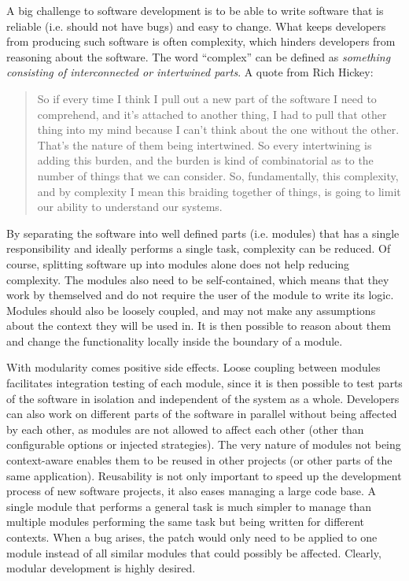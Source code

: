 \documentclass[a4paper,11pt]{kth-mag}
\begin{document}
        A big challenge to software development is to be able to write software that is reliable (i.e. should not have bugs) and easy to change.
        What keeps developers from producing such software is often complexity, which hinders developers from reasoning about the software.
        The word ``complex'' can be defined as \emph{something consisting of interconnected or intertwined parts}.
        A quote from Rich Hickey:
        \begin{quote}
          So if every time I think I pull out a new part of the software I need to comprehend, and it's attached to another thing, I had to pull that other thing into my mind because I can't think about the one without the other.
          That's the nature of them being intertwined. So every intertwining is adding this burden, and the burden is kind of combinatorial as to the number of things that we can consider.
          So, fundamentally, this complexity, and by complexity I mean this braiding together of things, is going to limit our ability to understand our systems.
        \end{quote}
        By separating the software into well defined parts (i.e. modules) that has a single responsibility and ideally performs a single task, complexity can be reduced.
        Of course, splitting software up into modules alone does not help reducing complexity.
        The modules also need to be self-contained, which means that they work by themselved and do not require the user of the module to write its logic.
        Modules should also be loosely coupled, and may not make any assumptions about the context they will be used in.
        It is then possible to reason about them and change the functionality locally inside the boundary of a module.
        
        With modularity comes positive side effects.
        Loose coupling between modules facilitates integration testing of each module, since it is then possible to test parts of the software in isolation and independent of the system as a whole.
        Developers can also work on different parts of the software in parallel without being affected by each other, as modules are not allowed to affect each other (other than configurable options or injected strategies).
        The very nature of modules not being context-aware enables them to be reused in other projects (or other parts of the same application).
        Reusability is not only important to speed up the development process of new software projects, it also eases managing a large code base.
        A single module that performs a general task is much simpler to manage than multiple modules performing the same task but being written for different contexts.
        When a bug arises, the patch would only need to be applied to one module instead of all similar modules that could possibly be affected.
        Clearly, modular development is highly desired.
\end{document}
